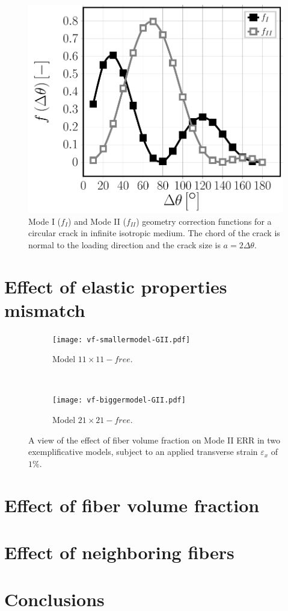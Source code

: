 \documentclass[review]{elsarticle}
\begin{document}
\begin{figure}
\includegraphics[width=\textwidth]{curvedcracks.pdf}
\caption{Mode I ($f_{I}$) and Mode II ($f_{II}$) geometry correction functions for a circular crack in infinite isotropic medium. The chord of the crack is normal to the loading direction and the crack size is $a=2\Delta\theta$.}\label{fig:curvedcrackgeomcorr}
\end{figure}

\section{Effect of elastic properties mismatch}

\begin{figure}[!h]
\centering
    \begin{subfigure}[b]{0.475\textwidth}
        \texttt{[image: vf-smallermodel-GII.pdf]}
        \caption{Model $11\times 11-free$.}\label{subfig:volfracsmallerMII}
    \end{subfigure} ~
    \begin{subfigure}[b]{0.475\textwidth}
        \texttt{[image: vf-biggermodel-GII.pdf]}
        \caption{Model $21\times 21-free$.}\label{subfig:volfracbiggerMII}
    \end{subfigure}

\caption{A view of the effect of fiber volume fraction on Mode II ERR in two exemplificative models, subject to an applied transverse strain $\varepsilon_{x}$ of $1\%$.}\label{fig:volumefractionMII}
\end{figure}

\section{Effect of fiber volume fraction}

\section{Effect of neighboring fibers}






\section{Conclusions}
\end{document}
